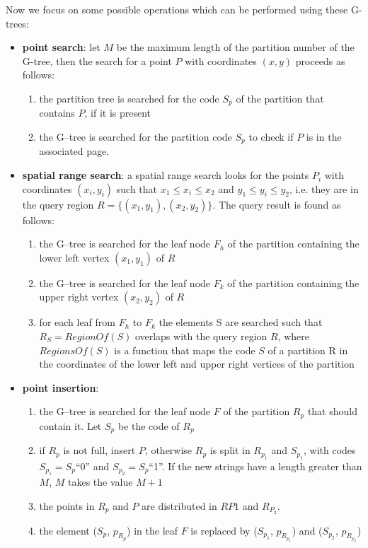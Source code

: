Now we focus on some possible operations which can be performed using these G-trees:

\begin{itemize}
    \item \textbf{point search}: let $M$ be the maximum length of the partition number of the G-tree, then the search for a point $P$ with coordinates $(x,y)$ proceeds as follows:

    \begin{enumerate}
        \item the partition tree is searched for the code $S_p$ of the partition that contains $P$, if it is present
        \item the G–tree is searched for the partition code $S_p$ to check if $P$ is in the associated page.
    \end{enumerate}
    
    \item \textbf{spatial range search}: a spatial range search looks for the points $P_i$ with coordinates $(x_i, y_i)$ such that $x_1 \leq x_i \leq x_2$ and $y_1 \leq y_i \leq y_2$, i.e. they are in the query region $R = \{ (x_1, y_1), (x_2, y_2) \}$. The query result is found as follows:

    \begin{enumerate}
        \item the G–tree is searched for the leaf node $F_h$ of the partition containing the lower left vertex $(x_1, y_1)$ of $R$
        \item the G–tree is searched for the leaf node $F_k$ of the partition containing the upper right vertex $(x_2, y_2)$ of $R$
        \item for each leaf from $F_h$ to $F_k$ the elements S are searched such that $R_S = RegionOf(S)$ overlaps with the query region $R$, where $RegionsOf(S)$ is a function that maps the code $S$ of a partition R in the coordinates of the lower left and upper right vertices of the partition
    \end{enumerate}

    \item \textbf{point insertion}: 

    \begin{enumerate}
        \item the G–tree is searched for the leaf node $F$ of the partition $R_p$ that should contain it. Let $S_p$ be the code of $R_p$
        \item if $R_p$ is not full, insert $P$, otherwise $R_p$ is split in $R_p_1$ and $S_p_1$, with codes $S_p_1 = S_p$“0” and $S_p_2 = S_p$“1”. If the new strings have a length greater than $M$, $M$ takes the value $M+1$
        \item the points in $R_p$ and $P$ are distributed in $RP1$ and $R_P_2$. 
        \item the element ($S_p$, $p_R_p$) in the leaf $F$ is replaced by ($S_p_1$, $p_R_p_1$) and ($S_p_2$, $p_R_p_2$)
    \end{enumerate}


\end{itemize}
